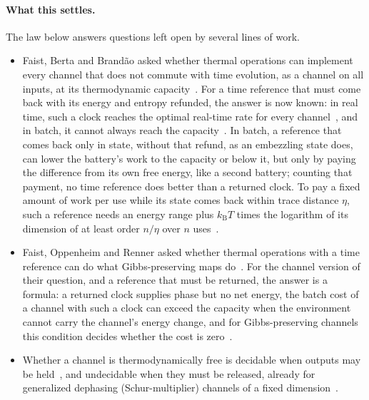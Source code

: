 \documentclass[11pt]{article}
\newcommand{\kB}{k_{\mathrm B}}
\begin{document}
\paragraph{What this settles.} The law below answers questions left open by several lines of work.
\begin{itemize}
\item Faist, Berta and Brand\~ao asked whether thermal operations can implement every channel that does not commute with time evolution, as a channel on all inputs, at its thermodynamic capacity~\cite{FBB19,FBB21}. For a time reference that must come back with its energy and entropy refunded, the answer is now known: in real time, such a clock reaches the optimal real-time rate for every channel~\cite[Thm.~11]{SaveWork}, and in batch, it cannot always reach the capacity~\cite[Thm.~7]{KeepingTime}. In batch, a reference that comes back only in state, without that refund, as an embezzling state does, can lower the battery's work to the capacity or below it, but only by paying the difference from its own free energy, like a second battery; counting that payment, no time reference does better than a returned clock. To pay a fixed amount of work per use while its state comes back within trace distance $\eta$, such a reference needs an energy range plus $\kB T$ times the logarithm of its dimension of at least order $n/\eta$ over $n$ uses~\cite[Cor.~17]{KeepingTime}.
\item Faist, Oppenheim and Renner asked whether thermal operations with a time reference can do what Gibbs-preserving maps do~\cite{FOR15}. For the channel version of their question, and a reference that must be returned, the answer is a formula: a returned clock supplies phase but no net energy, the batch cost of a channel with such a clock can exceed the capacity when the environment cannot carry the channel's energy change, and for Gibbs-preserving channels this condition decides whether the cost is zero~\cite[Thms.~6--7]{KeepingTime}.
\item Whether a channel is thermodynamically free is decidable when outputs may be held~\cite[Sec.~6]{Order}, and undecidable when they must be released, already for generalized dephasing (Schur-multiplier) channels of a fixed dimension~\cite[Thm.~13]{SaveWork}.
\end{itemize}
\end{document}
